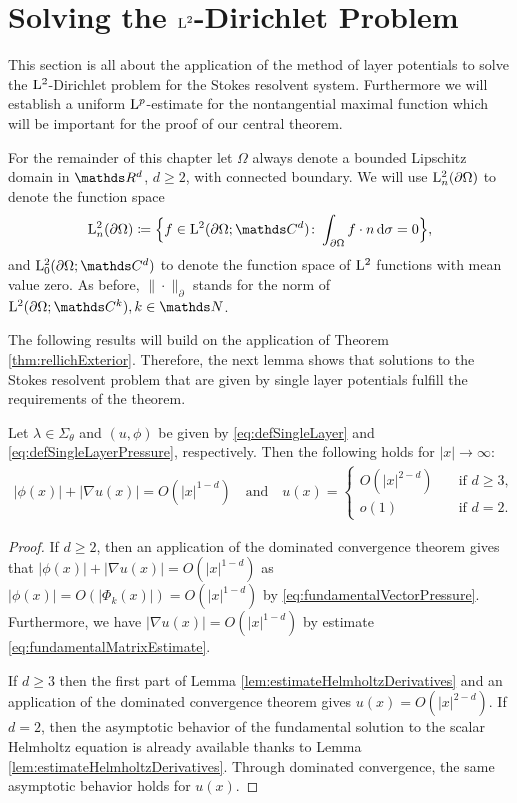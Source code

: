 \chapter{Solving the $\mathrm{L}^2$-Dirichlet Problem}
\label{chap:5}

This section is all about the application of the method of layer potentials to solve the $\mathrm{L}^2$-Dirichlet problem for the Stokes resolvent system.
Furthermore we will establish a uniform $\mathrm{L}^p$-estimate for the nontangential maximal function which will be important for the proof of our central theorem.

For the remainder of this chapter let $\Omega$ always denote a bounded Lipschitz domain in $\R^d$, $d \geq 2$, with connected boundary.
We will use $\mathrm{L}^2_n(\partial\Omega)$ to denote the function space
\begin{align*}
  \Ell^2_n(\partial\Omega) \coloneqq \Big\{ f \in \Ell^2(\partial\Omega; \C^d) \colon \int_{\partial\Omega} f \cdot n \d \sigma = 0 \Big\},
\end{align*}
and $\Ell_0^2(\partial\Omega; \C^d)$  to denote the function space of $\mathrm{L}^2$ functions with mean value zero.
As before, $\| \cdot \|_\partial$ stands for the norm of $\Ell^2(\partial\Omega; \C^k), k \in \N$.

The following results will build on the application of Theorem \ref{thm:rellichExterior}.
Therefore, the next lemma shows that solutions to the Stokes resolvent problem that are given by single layer potentials fulfill the requirements of the theorem.

\begin{lem}
  \label{lem:requirements}
  Let $\lambda \in \Sigma_\theta$ and $(u,\phi)$ be given by \eqref{eq:defSingleLayer} and \eqref{eq:defSingleLayerPressure}, respectively.
  Then the following holds for $|x| \to \infty$:
  \begin{align*}
    |\phi(x)| + |\nabla u(x)| = O(|x|^{1 - d}) \quad\text{and}\quad 
    u(x) = \begin{cases} O(|x|^{2 - d}) &\quad\text{if } d \geq 3, \\ o(1) &\quad\text{if } d = 2. \end{cases}
  \end{align*}
\end{lem}

\begin{proof}
  If $d \geq 2$, then an application of the dominated convergence theorem gives that $|\phi(x)| + |\nabla u(x)| = O(|x|^{1 - d})$ as $|\phi(x)| = O(|\Phi_k(x)|) = O(|x|^{1 - d})$ by \eqref{eq:fundamentalVectorPressure}.
 Furthermore, we have $|\nabla u(x)| = O(|x|^{1 - d})$ by estimate \ref{eq:fundamentalMatrixEstimate}.

  If $d \geq 3$ then the first part of Lemma \ref{lem:estimateHelmholtzDerivatives} and an application of the dominated convergence theorem gives $u(x) = O(|x|^{2 - d})$.
  If $d = 2$, then the asymptotic behavior of the fundamental solution to the scalar Helmholtz equation is already available thanks to Lemma \ref{lem:estimateHelmholtzDerivatives}. Through dominated convergence, the same asymptotic behavior holds for $u(x)$.
\end{proof}

